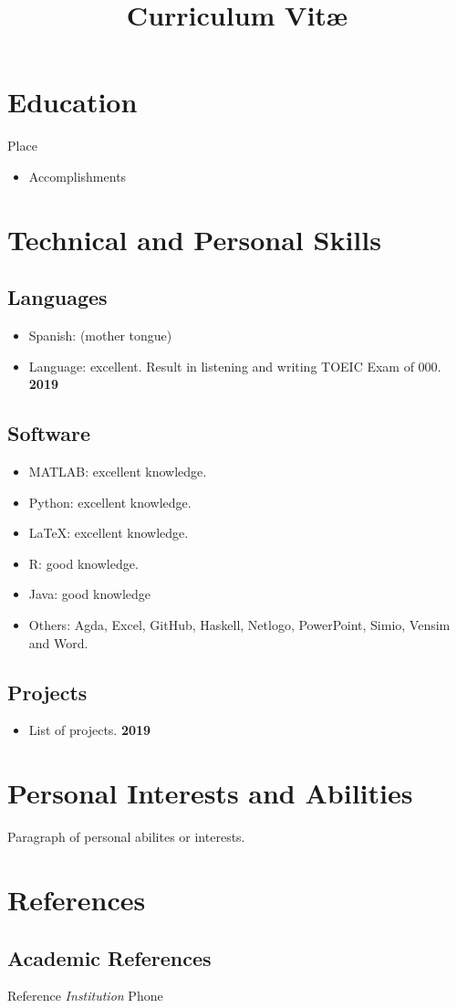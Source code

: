 \documentclass[11pt,a4paper,sans]{moderncv}
\title{Curriculum Vit\ae{}}
\begin{document}
\makecvtitle

\section{Education}
 {Place}{}
{\vspace{3pt}
  \begin{itemize}
    \item Accomplishments
  \end{itemize}
}

\vspace{6pt}


\vspace{6pt}

 \section{Technical and Personal Skills}
 \subsection{Languages}
 \begin{itemize}
   \item Spanish: (mother tongue)
   \item Language: excellent. Result in listening and writing TOEIC
     Exam of 000. \hfill \textbf{2019}
   \end{itemize}

 \subsection{Software}
 \begin{itemize}
 \item MATLAB: excellent knowledge.
 \item Python: excellent knowledge.
 \item \LaTeX: excellent knowledge.
 \item R: good knowledge.
 \item Java: good knowledge
 \item Others: Agda, Excel, GitHub, Haskell, Netlogo, PowerPoint,
   Simio, Vensim and Word.
 \end{itemize}

 \subsection{Projects}
 \begin{itemize}
     \item List of projects. \hfill \textbf{2019}
  \end{itemize}

\section{Personal Interests and Abilities}
Paragraph of personal abilites or interests.

\section{References}
\subsection{Academic References}
Reference \hspace{80pt} \textit{Institution}
\hspace{80pt} Phone
\end{document}
